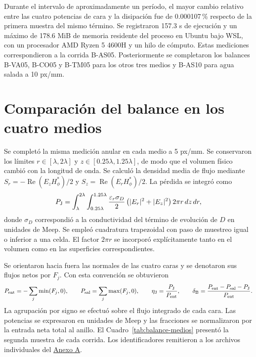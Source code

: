 Durante el intervalo de aproximadamente un período, el mayor cambio relativo entre las cuatro potencias de cara y la disipación fue de 0.000107\,\% respecto de la primera muestra del mismo término. Se registraron 157.3 s de ejecución y un máximo de 178.6 MiB de memoria residente del proceso en Ubuntu bajo WSL, con un procesador AMD Ryzen 5 4600H y un hilo de cómputo. Estas mediciones correspondieron a la corrida B-AS05. Posteriormente se completaron los balances B-VA05, B-CO05 y B-TM05 para los otros tres medios y B-AS10 para agua salada a 10 px/mm.

\section{Comparación del balance en los cuatro medios}\label{sec:balance-comparativo}
Se completó la misma medición anular en cada medio a 5 px/mm. Se conservaron los límites $r\in[\lambda,2\lambda]$ y $z\in[0.25\lambda,1.25\lambda]$, de modo que el volumen físico cambió con la longitud de onda. Se calculó la densidad media de flujo mediante $S_r=-\operatorname{Re}(E_zH_\phi^*)/2$ y $S_z=\operatorname{Re}(E_rH_\phi^*)/2$. La pérdida se integró como
\begin{equation}
 P_{\rm J}=\int_{\lambda}^{2\lambda}\int_{0.25\lambda}^{1.25\lambda}
 \frac{\varepsilon_r\sigma_D}{2}\left(|E_r|^2+|E_z|^2\right)2\pi r\, dz\,dr,
 \label{eq:joule-anular}
\end{equation}
donde $\sigma_D$ correspondió a la conductividad del término de evolución de $D$ en unidades de Meep. Se empleó cuadratura trapezoidal con paso de muestreo igual o inferior a una celda. El factor $2\pi r$ se incorporó explícitamente tanto en el volumen como en las superficies correspondientes.

Se orientaron hacia fuera las normales de las cuatro caras y se denotaron sus flujos netos por $F_j$. Con esta convención se obtuvieron
\begin{equation}
 P_{\rm ent}=-\sum_j\min(F_j,0),\qquad
 P_{\rm sal}=\sum_j\max(F_j,0),\qquad
 \eta_{\rm J}=\frac{P_{\rm J}}{P_{\rm ent}},\qquad
 \delta_{\rm B}=\frac{P_{\rm ent}-P_{\rm sal}-P_{\rm J}}{P_{\rm ent}}.
 \label{eq:balance-normalizado}
\end{equation}
La agrupación por signo se efectuó sobre el flujo integrado de cada cara. Las potencias se expresaron en unidades de Meep y las fracciones se normalizaron por la entrada neta total al anillo. El Cuadro~\ref{tab:balance-medios} presentó la segunda muestra de cada corrida. Los identificadores remitieron a los archivos individuales del \hyperref[an:balance-registros]{Anexo A}.

